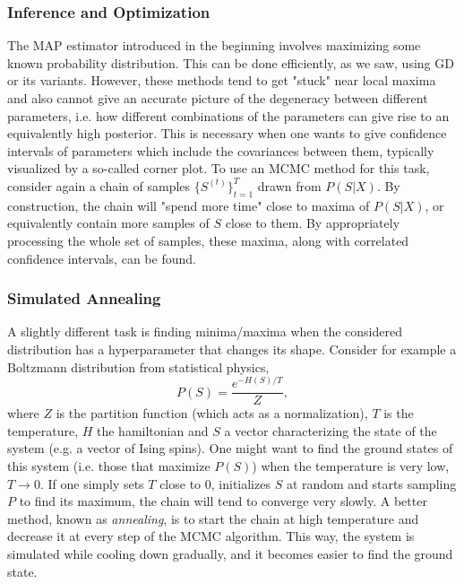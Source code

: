 \documentclass{article}
\begin{document}
\subsubsection*{Inference and Optimization}
The MAP estimator introduced in the beginning involves maximizing some known probability distribution. This can be done efficiently, as we saw, using GD or its variants. However, these methods tend to get "stuck" near local maxima and also cannot give an accurate picture of the degeneracy between different parameters, i.e. how different combinations of the parameters can give rise to an equivalently high posterior. This is necessary when one wants to give confidence intervals of parameters which include the covariances between them, typically visualized by a so-called corner plot. To use an MCMC method for this task, consider again a chain of samples $\{S^{(t)}\}_{t=1}^T$ drawn from $P(S | X)$. By construction, the chain will "spend more time" close to maxima of $P(S | X)$, or equivalently contain more samples of $S$ close to them. By appropriately processing the whole set of samples, these maxima, along with correlated confidence intervals, can be found.
\subsubsection*{Simulated Annealing}
A slightly different task is finding minima/maxima when the considered distribution has a hyperparameter that changes its shape. Consider for example a Boltzmann distribution from statistical physics,
\begin{equation}
    P(S) = \frac{e^{-H(S)/T}}{Z},
\end{equation}
where $Z$ is the partition function (which acts as a normalization), $T$ is the temperature, $H$ the hamiltonian and $S$ a vector characterizing the state of the system (e.g. a vector of Ising spins). One might want to find the ground states of this system (i.e. those that maximize $P(S)$) when the temperature is very low, $T\rightarrow 0$. If one simply sets $T$ close to 0, initializes $S$ at random and starts sampling $P$ to find its maximum, the chain will tend to converge very slowly. A better method, known as \emph{annealing}, is to start the chain at high temperature and decrease it at every step of the MCMC algorithm. This way, the system is simulated while cooling down gradually, and it becomes easier to find the ground state.
\end{document}
